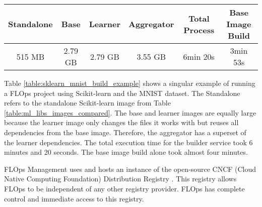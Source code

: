 \begin{changemargin}{0cm}{0cm}
    \centering
    \begin{tabular}{|c|c|c|c|c|c|}
        \hline
            \textbf{Standalone} & \textbf{Base} & \textbf{Learner} & \textbf{Aggregator} & \textbf{Total Process} & \textbf{Base Image Build} \\
        \hline
            515 MB & 2.79 GB & 2.79 GB & 3.55 GB & 6min 20s & 3min 53s
        \\
        \hline
    \end{tabular}
    \label{table:sklearn_mnist_build_example}
\end{changemargin}
Table \ref{table:sklearn_mnist_build_example} shows a singular example of running a FLOps project using Scikit-learn and the MNIST dataset.
The Standalone refers to the standalone Scikit-learn image from Table \ref{table:ml_libs_images_compared}.
The base and learner images are equally large because the learner image only changes the files it works with but reuses all dependencies from the base image.
Therefore, the aggregator has a superset of the learner dependencies.
The total execution time for the builder service took 6 minutes and 20 seconds.
The base image build alone took almost four minutes.

FLOps Management uses and hosts an instance of the open-source CNCF (Cloud Native Computing Foundation) Distribution Registry \cite{docs:cncf_distribution_registry}.
This registry allows FLOps to be independent of any other registry provider.
FLOps has complete control and immediate access to this registry.
